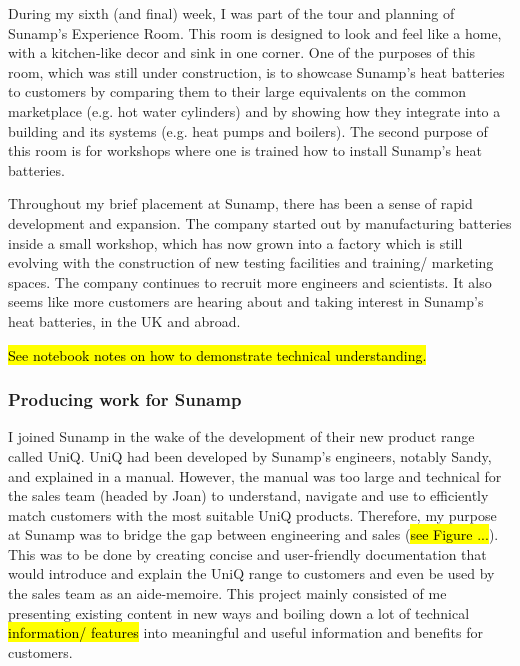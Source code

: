 During my sixth (and final) week, I was part of the tour and planning of Sunamp's Experience Room.
This room is designed to look and feel like a home, with a kitchen-like decor and sink in one corner.
One of the purposes of this room, which was still under construction, is to showcase Sunamp's heat batteries to customers by comparing them to their large equivalents on the common marketplace (e.g. hot water cylinders) and by showing how they integrate into a building and its systems (e.g. heat pumps
and boilers).
The second purpose of this room is for workshops where one is trained how to install Sunamp's heat batteries.

Throughout my brief placement at Sunamp, there has been a sense of rapid development and expansion.
The company started out by manufacturing batteries inside a small workshop, which has now grown into a factory which is still evolving with the construction of new testing facilities and training/ marketing spaces.
The company continues to recruit more engineers and scientists.
It also seems like more customers are hearing about and taking interest in Sunamp's heat batteries, in the UK and abroad.

\hl{See notebook notes on how to demonstrate technical understanding.}



\subsubsection{Producing work for Sunamp}


I joined Sunamp in the wake of the development of their new product range called UniQ.
UniQ had been developed by Sunamp's engineers, notably Sandy, and explained in a manual.
However, the manual was too large and technical for the sales team (headed by Joan) to understand, navigate and use to efficiently match customers with the most suitable UniQ products.
Therefore, my purpose at Sunamp was to bridge the gap between engineering and sales (\hl{see Figure ...}).
This was to be done by creating concise and user-friendly documentation that would introduce and explain the UniQ range to customers and even be used by the sales team as an aide-memoire.
This project mainly consisted of me presenting existing content in new ways and boiling down a lot of technical \hl{information/ features} into meaningful and useful information and benefits for customers.

